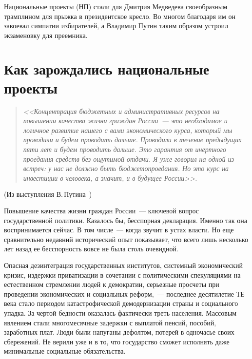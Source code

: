\documentclass[article, 12pt, russian, oneside]{ncc}
\begin{document}
Национальные проекты (НП) стали для Дмитрия Медведева своеобразным
трамплином для прыжка в президентское кресло. Во многом благодаря им
он завоевал симпатии избирателей, а Владимир Путин таким образом
устроил экзаменовку для преемника.


\newpage

\section{Как зарождались национальные проекты}

\begin{quote}
  \emph{<<Концентрация бюджетных и административных ресурсов на
    повышении качества жизни граждан России~--- это необходимое и
    логичное развитие нашего с вами экономического курса, который мы
    проводили и будем проводить дальше. Проводили в течение предыдущих
    пяти лет и будем проводить дальше. Это гарантия от инертного
    проедания средств без ощутимой отдачи. Я уже говорил на одной из
    встреч: у нас не должно быть бюджетопроедания. Но это курс на
    инвестиции в человека, а значит, и в будущее России>>.}
\end{quote}
\begin{flushright}
  (Из выступления В.\,Путина~\cite{Putin_RG})
\end{flushright}

Повышение качества жизни граждан России~--- ключевой вопрос
государственной политики. Казалось бы, бесспорная декларация. Именно
так она воспринимается сейчас. В том числе~--- когда звучит в устах
власти. Но еще сравнительно недавний исторический опыт показывает, что
всего лишь несколько лет назад ее бесспорность вовсе не была столь
очевидной.

Опасная дезинтеграция государственных институтов, системный
экономический кризис, издержки приватизации в сочетании с
политическими спекуляциями на естественном стремлении людей к
демократии, серьезные просчеты при проведении экономических и
социальных реформ,~--- последнее десятилетие ТЕ века стало периодом
катастрофической демодернизации страны и социального упадка. За чертой
бедности оказалась фактически треть населения. Массовым явлением стали
многомесячные задержки с выплатой пенсий, пособий, заработных
плат. Люди были напуганы дефолтом, потерей в одночасье своих
сбережений. Не верили уже и в то, что государство сможет исполнять
даже минимальные социальные обязательства.
\end{document}
